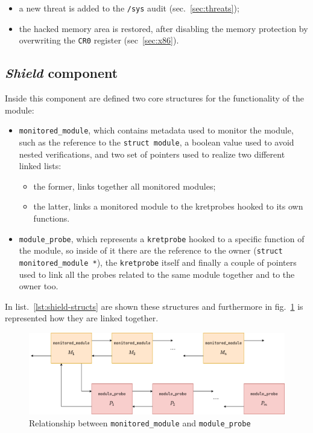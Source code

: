 \documentclass{article}
\begin{document}
	\begin{itemize}
		\item a new threat is added to the \texttt{/sys} audit (sec.~\ref{sec:threats});
		\item the hacked memory area is restored, after disabling the memory protection by overwriting the \texttt{CR0}
		register (sec~\ref{sec:x86}).
	\end{itemize}

	\subsection{\emph{Shield} component}\label{sec:shield}
	Inside this component are defined two core structures for the functionality of the module:
	\begin{itemize}
		\item \texttt{monitored\_module}, which contains metadata used to monitor the module, such as the reference to
		the \texttt{struct module}, a boolean value used to avoid nested verifications, and two set of pointers used to
		realize two different linked lists:
		\begin{itemize}
			\item the former, links together all monitored modules;
			\item the latter, links a monitored module to the kretprobes hooked to its own functions.
		\end{itemize}

		\item \texttt{module\_probe}, which represents a \texttt{kretprobe} hooked to a specific function of the module,
		so inside of it there are the reference to the owner (\texttt{struct monitored\_module *}), the
		\texttt{kretprobe} itself and finally a couple of pointers used to link all the probes related to the same
		module together and to the owner too.
	\end{itemize}

	In list.~\ref{lst:shield-structs} are shown these structures and furthermore in fig.~\ref{fig:shield-structs} is
	represented how they are linked together.

	\begin{figure}[!htbp]
		\centering
		\includegraphics[scale=0.4]{shield-structs}
		\caption{Relationship between \texttt{monitored\_module} and \texttt{module\_probe}}
		\label{fig:shield-structs}
	\end{figure}
\end{document}

